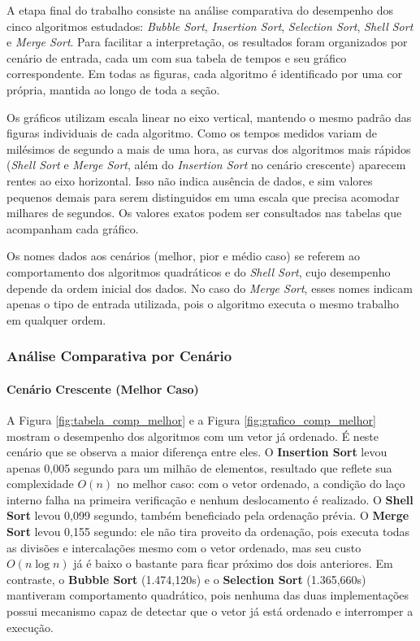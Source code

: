 
\qquad A etapa final do trabalho consiste na análise comparativa do desempenho dos cinco algoritmos estudados: \textit{Bubble Sort}, \textit{Insertion Sort}, \textit{Selection Sort}, \textit{Shell Sort} e \textit{Merge Sort}. Para facilitar a interpretação, os resultados foram organizados por cenário de entrada, cada um com sua tabela de tempos e seu gráfico correspondente. Em todas as figuras, cada algoritmo é identificado por uma cor própria, mantida ao longo de toda a seção.

\qquad Os gráficos utilizam escala linear no eixo vertical, mantendo o mesmo padrão das figuras individuais de cada algoritmo. Como os tempos medidos variam de milésimos de segundo a mais de uma hora, as curvas dos algoritmos mais rápidos (\textit{Shell Sort} e \textit{Merge Sort}, além do \textit{Insertion Sort} no cenário crescente) aparecem rentes ao eixo horizontal. Isso não indica ausência de dados, e sim valores pequenos demais para serem distinguidos em uma escala que precisa acomodar milhares de segundos. Os valores exatos podem ser consultados nas tabelas que acompanham cada gráfico.

\qquad Os nomes dados aos cenários (melhor, pior e médio caso) se referem ao comportamento dos algoritmos quadráticos e do \textit{Shell Sort}, cujo desempenho depende da ordem inicial dos dados. No caso do \textit{Merge Sort}, esses nomes indicam apenas o tipo de entrada utilizada, pois o algoritmo executa o mesmo trabalho em qualquer ordem.

\subsubsection*{Análise Comparativa por Cenário}

\paragraph{Cenário Crescente (Melhor Caso)}
A Figura \ref{fig:tabela_comp_melhor} e a Figura \ref{fig:grafico_comp_melhor} mostram o desempenho dos algoritmos com um vetor já ordenado. É neste cenário que se observa a maior diferença entre eles. O \textbf{Insertion Sort} levou apenas 0,005 segundo para um milhão de elementos, resultado que reflete sua complexidade $O(n)$ no melhor caso: com o vetor ordenado, a condição do laço interno falha na primeira verificação e nenhum deslocamento é realizado. O \textbf{Shell Sort} levou 0,099 segundo, também beneficiado pela ordenação prévia. O \textbf{Merge Sort} levou 0,155 segundo: ele não tira proveito da ordenação, pois executa todas as divisões e intercalações mesmo com o vetor ordenado, mas seu custo $O(n \log n)$ já é baixo o bastante para ficar próximo dos dois anteriores. Em contraste, o \textbf{Bubble Sort} (1.474,120s) e o \textbf{Selection Sort} (1.365,660s) mantiveram comportamento quadrático, pois nenhuma das duas implementações possui mecanismo capaz de detectar que o vetor já está ordenado e interromper a execução.

